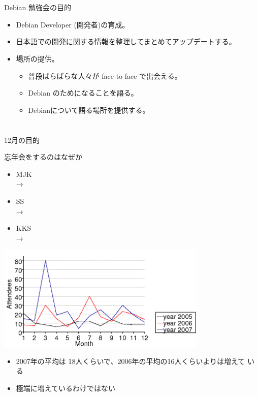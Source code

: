\documentclass[cjk,dvipdfmx,12pt]{beamer}
\begin{document}
\section{}
\begin{frame}{Debian 勉強会の目的}

\begin{itemize}

 \item Debian Developer (開発者)の育成。

 \item  日本語での開発に関する情報を整理してまとめてアップデートする。

 \item 場所の提供。
\begin{itemize}
 \item 普段ばらばらな人々が face-to-face で出会える。
 \item Debian のためになることを語る。
 \item Debianについて語る場所を提供する。
\end{itemize}

\end{itemize}

\end{frame}

\section{}

\begin{frame}{12月の目的}

 忘年会をするのはなぜか

\begin{itemize}
 \item MJK\\
       →
 \item SS\\
       →
 \item KKS\\
       →
\end{itemize}
\end{frame}

\begin{frame}{}
 \includegraphics[width=10cm]{image200712/people-chart.png}
\begin{itemize}
 \item 2007年の平均は 18人くらいで、2006年の平均の16人くらいよりは増えて
       いる
 \item 極端に増えているわけではない
\end{itemize}
\end{frame}
\end{document}
